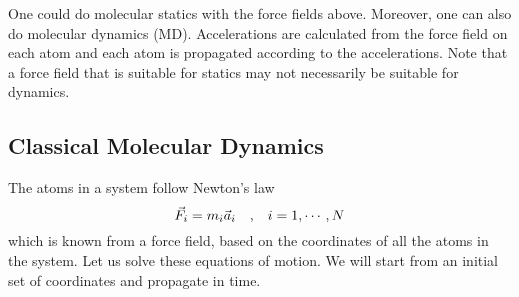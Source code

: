 \documentclass[12pt,a4paper,titlepage]{article}
\begin{document}
One could do molecular statics with the force fields above. Moreover, one can also do molecular dynamics (MD). Accelerations are calculated from the force field on each atom and each atom is propagated according to the accelerations. Note that a force field that is suitable for statics may not necessarily be suitable for dynamics.

\subsection{Classical Molecular Dynamics}
The atoms in a system follow Newton's law
\begin{equation}
\vec{F}_{i}=m_{i}\vec{a}_{i}\qq{,}i=1,\cdots,N
\end{equation}
which is known from a force field, based on the coordinates of all the atoms in the system. Let us solve these equations of motion. We will start from an initial set of coordinates and propagate in time.\\
\end{document}
